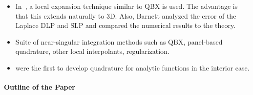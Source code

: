 \documentclass[preprint, 10pt]{elsarticle}
\begin{document}
\begin{itemize}
\item In~\cite{bar2014}, a local expansion technique similar to QBX is
used.  The advantage is that this extends naturally to 3D.  Also,
Barnett analyzed the error of the Laplace DLP and SLP and compared the
numerical results to the theory.

\item Suite of near-singular integration methods such as QBX,
panel-based quadrature, other local interpolants, regularization.

\item \cite{ioa-pap-per1991} were the first to develop quadrature for
analytic functions in the interior case.

\end{itemize}



\paragraph{Outline of the Paper}

\end{document}
